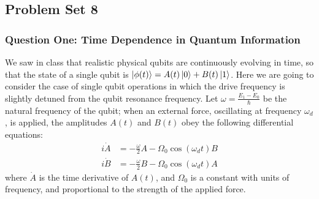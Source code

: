 \documentclass[reprint, amsmath,amssymb, aps]{revtex4-2}
\begin{document}
        \subsection{Problem Set 8}
            \subsubsection{Question One: Time Dependence in Quantum Information}
                We saw in class that realistic physical qubits are continuously evolving in time, so that the state of a single qubit is $\ket{\phi(t)} = A(t)\ket{0} + B(t)\ket{1}$. Here we are going to consider the case of single qubit operations in which the drive frequency is slightly detuned from the qubit resonance frequency. Let $\omega = \frac{E_1 - E_0}{\hbar}$ be the natural frequency of the qubit; when an external force, oscillating at frequency $\omega_d$, is applied, the amplitudes $A(t)$ and $B(t)$ obey the following differential equations:
                    \begin{align*}
                        i\dot{A} &= -\frac{\omega}{2} A - \Omega_0 \cos(\omega_d t) B \\
                        i\dot{B} &= -\frac{\omega}{2} B - \Omega_0 \cos(\omega_d t) A
                    \end{align*}
                where $\dot{A}$ is the time derivative of $A(t)$, and $\Omega_0$ is a constant with units of frequency, and proportional to the strength of the applied force.
\end{document}
